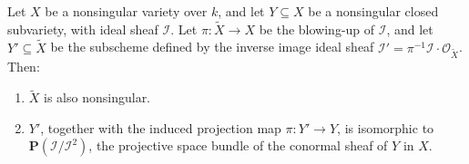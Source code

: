 Let $X$ be a nonsingular variety over $k$, and let $Y \subseteq X$ be a nonsingular closed subvariety, with ideal sheaf $\mathcal{I}$. Let $\pi: \tilde{X} \to X$ be the blowing-up of $\mathcal{I}$, and let $Y' \subseteq \tilde{X}$ be the subscheme defined by the inverse image ideal sheaf $\mathcal{I}' = \pi^{-1} \mathcal{I} \cdot \mathcal{O}_{\tilde{X}}$. Then:

\begin{enumerate}
\item[(a)] $\tilde{X}$ is also nonsingular.
\item[(b)] $Y'$, together with the induced projection map $\pi: Y' \to Y$, is isomorphic to $\mathbf{P}(\mathcal{I}/\mathcal{I}^2)$, the projective space bundle of the conormal sheaf of $Y$ in $X$.
\end{enumerate}
